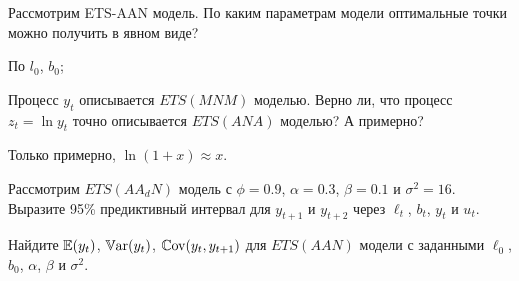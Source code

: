 \begin{problem}
Рассмотрим ETS-AAN модель. По каким параметрам модели оптимальные точки можно получить в явном виде?
\begin{sol}
По $l_0$, $b_0$;
\end{sol}
\end{problem}

\begin{problem}
Процесс $y_t$ описывается $ETS(MNM)$ моделью. 
Верно ли, что процесс $z_t = \ln y_t$ точно описывается $ETS(ANA)$ моделью? А примерно?
\begin{sol}
  Только примерно, $\ln (1 + x) \approx x$.
\end{sol}
\end{problem}
  

\begin{problem}
Рассмотрим $ETS(AA_dN)$ модель с $\phi = 0.9$, $\alpha=0.3$, $\beta=0.1$ и $\sigma^2=16$. 
Выразите 95\% предиктивный интервал для $y_{t+1}$ и $y_{t+2}$ через $\ell_t$, $b_t$, $y_t$ и $u_t$. 
\begin{sol}
\end{sol}
\end{problem}

\begin{problem}
Найдите $\operatorname{\mathbb{E}}(y_t)$, $\operatorname{\mathbb{V}\mathrm{ar}}(y_t)$, $\operatorname{\mathbb{C}\mathrm{ov}}(y_t, y_{t+1})$ для $ETS(AAN)$ модели с заданными $\ell_0$, $b_0$, $\alpha$, $\beta$ и $\sigma^2$.
\begin{sol}
\end{sol}
\end{problem}


